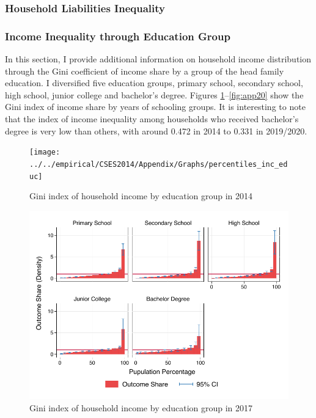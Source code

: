 \documentclass[11pt,letterpaper]{article}
\begin{document}
\subsubsection{Household Liabilities Inequality}
    



\clearpage


\subsubsection{Income Inequality through Education Group}

In this section, I provide additional information on household income distribution through the Gini coefficient of income share by a group of the head family education. I diversified five education groups, primary school, secondary school, high school, junior college and bachelor's degree. Figures \ref{fig:app18}--\ref{fig:app20} show the Gini index of income share by years of schooling groups. It is interesting to note that the index of income inequality among households who received bachelor's degree is very low than others, with around 0.472 in 2014 to 0.331 in 2019/2020. 
\begin{figure}[H]
	\centering
	\caption{Gini index of household income by education group in 2014}
	\label{fig:app18}
	\texttt{[image: ../../empirical/CSES2014/Appendix/Graphs/percentiles\_inc\_educ]}

\end{figure}

\begin{figure}
	\centering
		\caption{Gini index of household income by education group in 2017}
	\label{}
	\vspace{-1em}
	\includegraphics[width=1\linewidth]{../../empirical/CSES2017/Appendix/Graphs/percentiles_inc_educ}

\end{figure}
\end{document}
